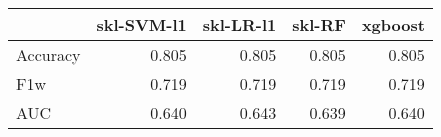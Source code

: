 \begin{tabular}{lrrrr}
\toprule
{} &  skl-SVM-l1 &  skl-LR-l1 &  skl-RF &  xgboost \\
\midrule
Accuracy &       0.805 &      0.805 &   0.805 &    0.805 \\
F1w      &       0.719 &      0.719 &   0.719 &    0.719 \\
AUC      &       0.640 &      0.643 &   0.639 &    0.640 \\
\bottomrule
\end{tabular}
